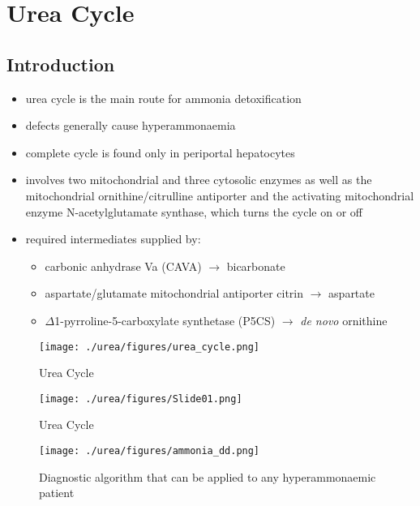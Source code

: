 \documentclass{scrartcl}
\begin{document}
\section{Urea Cycle}
\label{sec:org2e620f4}
\subsection{Introduction}
\label{sec:org6d264ea}
\begin{itemize}
\item urea cycle is the main route for ammonia detoxification
\item defects generally cause hyperammonaemia
\item complete cycle is found only in periportal hepatocytes
\item involves two mitochondrial and three cytosolic enzymes as well as
the mitochondrial ornithine/citrulline antiporter and the activating
mitochondrial enzyme N-acetylglutamate synthase, which turns the
cycle on or off
\item required intermediates supplied by:
\begin{itemize}
\item carbonic anhydrase Va (CAVA) \(\to\) bicarbonate
\item aspartate/glutamate mitochondrial antiporter citrin \(\to\) aspartate
\item \(\Delta\)1-pyrroline-5-carboxylate synthetase (P5CS) \(\to\) \emph{de novo} ornithine
\end{itemize}
\end{itemize}

\begin{figure}[htbp]
\centering
\texttt{[image: ./urea/figures/urea\_cycle.png]}
\caption{\label{fig:org61d4d6a}
Urea Cycle}
\end{figure}


\begin{figure}[htbp]
\centering
\texttt{[image: ./urea/figures/Slide01.png]}
\caption{\label{fig:orgc5ec799}
Urea Cycle}
\end{figure}


\begin{figure}[htbp]
\centering
\texttt{[image: ./urea/figures/ammonia\_dd.png]}
\caption{\label{fig:org519606a}
Diagnostic algorithm that can be applied to any hyperammonaemic patient}
\end{figure}
\end{document}
